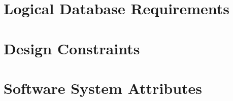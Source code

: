 \section{Logical Database Requirements}



\section{Design Constraints}



\section{Software System Attributes}




